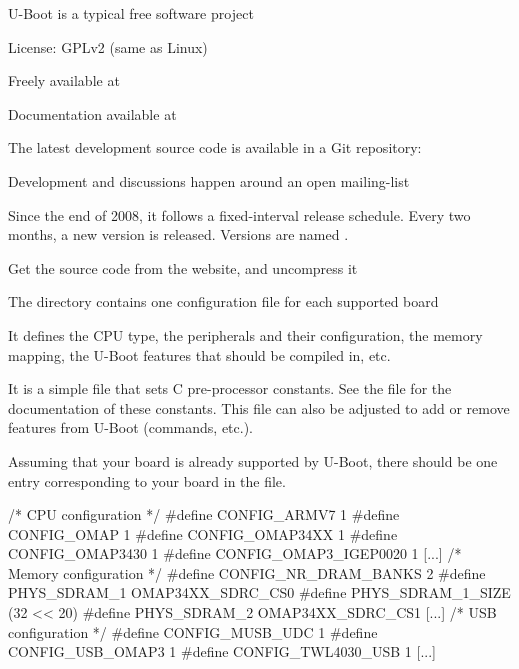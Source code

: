 
  U-Boot is a typical free software project
  \startitemize
  \item License: GPLv2 (same as Linux)
  \item Freely available at 
  \item Documentation available at
  \item The latest development source code is available in a Git
    repository:
  \item Development and discussions happen around an open mailing-list
  \item Since the end of 2008, it follows a fixed-interval release
    schedule. Every two months, a new version is released. Versions
    are named .
\stopitemize

  \startitemize
  \item Get the source code from the website, and uncompress it
  \item The  directory contains one
    configuration file for each supported board
    \startitemize
    \item It defines the CPU type, the peripherals and their configuration, the
      memory mapping, the U-Boot features that should be compiled in, etc.
    \item It is a simple  file that sets C pre-processor
      constants. See the  file for the documentation of
      these constants. This file can also be adjusted to add or remove
      features from U-Boot (commands, etc.).
    \stopitemize
  \item Assuming that your board is already supported by U-Boot, there
    should be one entry corresponding to your board in the
     file.
  \stopitemize

\starttyping
/* CPU configuration */
#define CONFIG_ARMV7 1
#define CONFIG_OMAP 1
#define CONFIG_OMAP34XX 1
#define CONFIG_OMAP3430 1
#define CONFIG_OMAP3_IGEP0020 1
[...]
/* Memory configuration */
#define CONFIG_NR_DRAM_BANKS 2
#define PHYS_SDRAM_1 OMAP34XX_SDRC_CS0
#define PHYS_SDRAM_1_SIZE (32 <<  20)
#define PHYS_SDRAM_2 OMAP34XX_SDRC_CS1
[...]
/* USB configuration */
#define CONFIG_MUSB_UDC 1
#define CONFIG_USB_OMAP3 1
#define CONFIG_TWL4030_USB 1
[...]
\stoptyping

